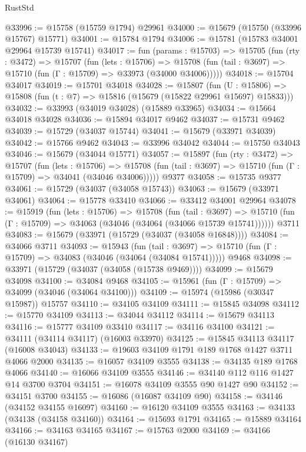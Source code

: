 \begin{lexlean}{RustStd}
\begin{coremodule}
@33996 := @15758 (@15759 @1794) @29961
@34000 := @15679 (@15750 (@33996 @15767) @15771)
@34001 := @15784 @1794
@34006 := @15781 (@15783 @34001 @29964 @15739 @15741)
@34017 := fun (params : @15703) =>
  @15705
    (fun (rty : @3472) =>
    @15707
      (fun (lets : @15706) =>
      @15708 (fun (tail : @3697) => @15710 (fun (Γ : @15709) => @33973 (@34000 @34006)))))
@34018 := @15704 @34017
@34019 := @15701 @34018
@34028 := @15807
    (fun (U : @15806) => @15808 (fun (t : @7) => @15816 (@15679 (@15822 @29961 @15697) @15833)))
@34032 := @33993 (@34019 @34028) (@15889 @33965)
@34034 := @15664 @34018 @34028
@34036 := @15894 @34017 @9462
@34037 := @15731 @9462
@34039 := @15729 (@34037 @15744)
@34041 := @15679 (@33971 @34039)
@34042 := @15766 @9462
@34043 := @33996 @34042
@34044 := @15750 @34043
@34046 := @15679 (@34044 @15771)
@34057 := @15897
    (fun (rty : @3472) =>
    @15707
      (fun (lets : @15706) =>
      @15708 (fun (tail : @3697) => @15710 (fun (Γ : @15709) => @34041 (@34046 @34006)))))
    @9377
@34058 := @15735 @9377
@34061 := @15729 (@34037 (@34058 @15743))
@34063 := @15679 (@33971 @34061)
@34064 := @15778 @33410
@34066 := @33412 @34001 @29964
@34078 := @15919
    (fun (lets : @15706) =>
    @15708
      (fun (tail : @3697) =>
      @15710 (fun (Γ : @15709) => @34063 (@34046 (@34064 (@34066 @15739 @15741))))))
    @3711
@34083 := @15679 (@33971 (@15729 (@34037 (@34058 @16848))))
@34084 := @34066 @3711
@34093 := @15943
    (fun (tail : @3697) => @15710 (fun (Γ : @15709) => @34083 (@34046 (@34064 (@34084 @15741)))))
    @9468
@34098 := @33971 (@15729 (@34037 (@34058 (@15738 @9469))))
@34099 := @15679 @34098
@34100 := @34084 @9468
@34105 := @15961 (fun (Γ : @15709) => @34099 (@34046 (@34064 @34100)))
@34109 := @15974 (@15986 (@30347 @15987)) @15757
@34110 := @34105 @34109
@34111 := @15845 @34098
@34112 := @15770 @34109
@34113 := @34044 @34112
@34114 := @15679 @34113
@34116 := @15777 @34109 @33410
@34117 := @34116 @34100
@34121 := @34111 (@34114 @34117) (@16003 @33970)
@34125 := @15845 @34113 @34117 (@16008 @34043)
@34133 := @19603 @34109 @1791 @189 @1768 @1427 @3711 @4066 @2000
@34135 := @16057 @34109 @3555
@34138 := @34135 @189 @1768 @4066
@34140 := @16066 @34109 @3555
@34146 := @34140 @112 @116 @1427 @14 @3700 @3704
@34151 := @16078 @34109 @3555 @90 @1427 @90
@34152 := @34151 @3700
@34155 := @16086 (@16087 @34109 @90)
@34158 := @34146 (@34152 @34155 @16097)
@34160 := @16120 @34109 @3555
@34163 := @34133 (@34138 (@34158 @34160))
@34164 := @15693 @1791
@34165 := @15889 @34164
@34166 := @34163 @34165
@34167 := @15763 @2000
@34169 := @34166 (@16130 @34167)

\end{coremodule}
\end{lexlean}
